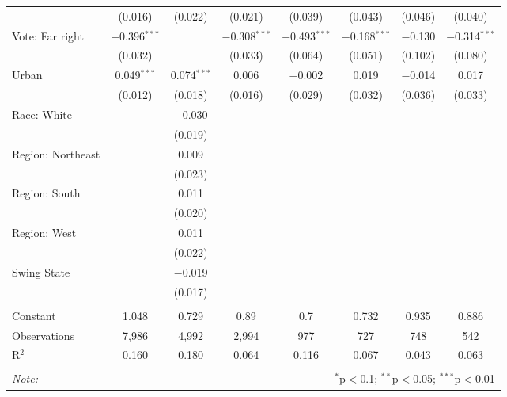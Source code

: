 \begin{tabular}{@{\extracolsep{5pt}}lccccccc}
  & (0.016) & (0.022) & (0.021) & (0.039) & (0.043) & (0.046) & (0.040) \\ 
  Vote: Far right & $-$0.396$^{***}$ &  & $-$0.308$^{***}$ & $-$0.493$^{***}$ & $-$0.168$^{***}$ & $-$0.130 & $-$0.314$^{***}$ \\ 
  & (0.032) &  & (0.033) & (0.064) & (0.051) & (0.102) & (0.080) \\ 
  Urban & 0.049$^{***}$ & 0.074$^{***}$ & 0.006 & $-$0.002 & 0.019 & $-$0.014 & 0.017 \\ 
  & (0.012) & (0.018) & (0.016) & (0.029) & (0.032) & (0.036) & (0.033) \\ 
  Race: White &  & $-$0.030 &  &  &  &  &  \\ 
  &  & (0.019) &  &  &  &  &  \\ 
  Region: Northeast &  & 0.009 &  &  &  &  &  \\ 
  &  & (0.023) &  &  &  &  &  \\ 
  Region: South &  & 0.011 &  &  &  &  &  \\ 
  &  & (0.020) &  &  &  &  &  \\ 
  Region: West &  & 0.011 &  &  &  &  &  \\ 
  &  & (0.022) &  &  &  &  &  \\ 
  Swing State &  & $-$0.019 &  &  &  &  &  \\ 
  &  & (0.017) &  &  &  &  &  \\ 
 \hline \\[-1.8ex] 
Constant & 1.048 & 0.729 & 0.89 & 0.7 & 0.732 & 0.935 & 0.886 \\ 
Observations & 7,986 & 4,992 & 2,994 & 977 & 727 & 748 & 542 \\ 
R$^{2}$ & 0.160 & 0.180 & 0.064 & 0.116 & 0.067 & 0.043 & 0.063 \\ 
\hline 
\hline \\[-1.8ex] 
\textit{Note:}  & \multicolumn{7}{r}{$^{*}$p$<$0.1; $^{**}$p$<$0.05; $^{***}$p$<$0.01} \\ 
\end{tabular} 